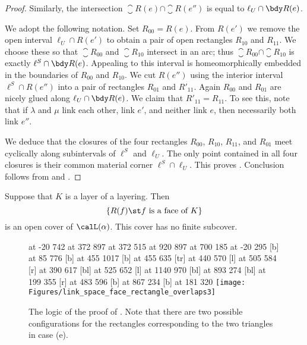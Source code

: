 \documentclass[12pt]{amsart}
\begin{document}
\begin{proof}
Similarly, the intersection $\closure{R}(e) \cap \closure{R}(e'')$ is equal to $\ell_U \cap \bdy R(e)$.

We adopt the following notation.  Set $R_{00} = R(e)$.  From $R(e')$ we remove the open interval $\ell_U \cap R(e')$ to obtain a pair of open rectangles $R_{10}$ and $R_{11}$.  We choose these so that $\closure{R}_{00}$ and $\closure{R}_{10}$ intersect in an arc; thus $\closure{R}_{00}\cap\closure{R}_{10}$ is exactly $\ell^S \cap \bdy R(e)$.  Appealing to  this interval is homeomorphically embedded in the boundaries of $R_{00}$ and $R_{10}$.  We cut $R(e'')$ using the interior interval $\ell^S \cap R(e'')$ into a pair of rectangles $R_{01}$ and $R'_{11}$.  Again $R_{00}$ and $R_{01}$ are nicely glued along $\ell_U \cap \bdy R(e)$.  We claim that $R'_{11} = R_{11}$.  To see this, note that if $\lambda$ and $\mu$ link each other, link $e'$, and neither link $e$, then necessarily both link $e''$. 

We deduce that the closures of the four rectangles $R_{00}$, $R_{10}$, $R_{11}$, and $R_{01}$ meet cyclically along subintervals of $\ell^S$ and $\ell_U$.  The only point contained in all four closures is their common material corner $\ell^S \cap \ell_U$.  This proves .  Conclusion  follows from  and .
\end{proof}

\begin{lemma}
\label{Lem:FacesCover}
Suppose that $K$ is a layer of a layering.  Then
\[
\{ R(f) \st \mbox{$f$ is a face of $K$} \}
\]
is an open cover of $\calL(\alpha)$.  This cover has no finite subcover.
\end{lemma}

\begin{figure}[htbp]
\centering
{}
\small\hair 2pt
 at -20 742
  at 372 897
  at 372 515
 at 920 897
 at 700 185
 at -20 295
\scriptsize
{} [b] at 85 776
 [b] at 455 1017
 [b] at 455 635
 [tr] at 440 570
 [l] at 505 584
 [r] at 390 617
 [bl] at 525 652
 [l] at 1140 970
 [bl] at 893 274
 [bl] at 199 355
\tiny
{} [r] at 483 596
 [b] at 867 234
 [b] at 181 320
\endlabellist
\texttt{[image: Figures/link\_space\_face\_rectangle\_overlaps3]}
\caption{The logic of the proof of . Note that there are two possible configurations for the rectangles corresponding to the two triangles in case (e).} 
\label{Fig:LinkSpaceFaceFlowChart}
\end{figure}
\end{document}
